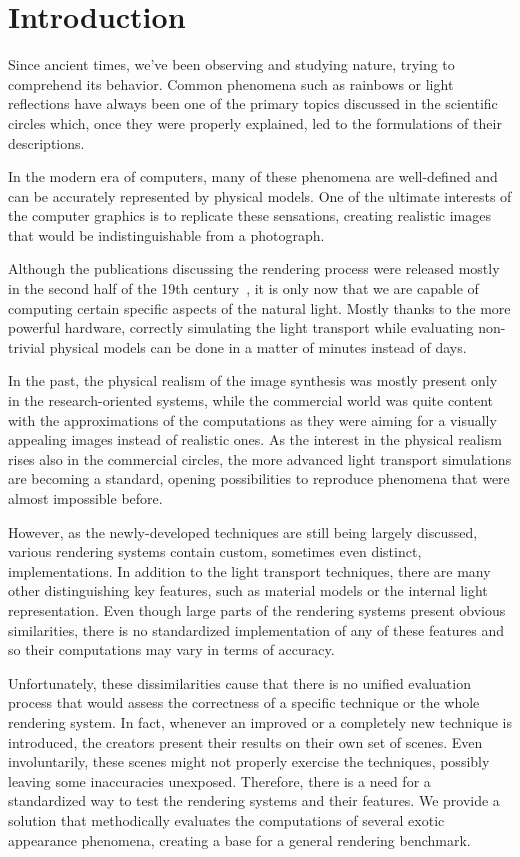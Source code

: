 \chapter*{Introduction}

Since ancient times, we've been observing and studying nature, trying to comprehend its behavior. Common phenomena such as rainbows or light reflections have always been one of the primary topics discussed in the scientific circles which, once they were properly explained, led to the formulations of their descriptions.

In the modern era of computers, many of these phenomena are well-defined and can be accurately represented by physical models. One of the ultimate interests of the computer graphics is to replicate these sensations, creating realistic images that would be indistinguishable from a photograph.

Although the publications discussing the rendering process were released mostly in the second half of the 19th century~\cite{kajiya1986rendering}\cite{nicodemus1965directional}, it is only now that we are capable of computing certain specific aspects of the natural light. Mostly thanks to the more powerful hardware, correctly simulating the light transport while evaluating non-trivial physical models can be done in a matter of minutes instead of days.

In the past, the physical realism of the image synthesis was mostly present only in the research-oriented systems, while the commercial world was quite content with the approximations of the computations as they were aiming for a visually appealing images instead of realistic ones. As the interest in the physical realism rises also in the commercial circles, the more advanced light transport simulations are becoming a standard, opening possibilities to reproduce phenomena that were almost impossible before.

However, as the newly-developed techniques are still being largely discussed, various rendering systems contain custom, sometimes even distinct, implementations. In addition to the light transport techniques, there are many other distinguishing key features, such as material models or the internal light representation. Even though large parts of the rendering systems present obvious similarities, there is no standardized implementation of any of these features and so their computations may vary in terms of accuracy.

Unfortunately, these dissimilarities cause that there is no unified evaluation process that would assess the correctness of a specific technique or the whole rendering system. In fact, whenever an improved or a completely new technique is introduced, the creators present their results on their own set of scenes. Even involuntarily, these scenes might not properly exercise the techniques, possibly leaving some inaccuracies unexposed. Therefore, there is a need for a standardized way to test the rendering systems and their features. We provide a solution that methodically evaluates the computations of several exotic appearance phenomena, creating a base for a general rendering benchmark.

